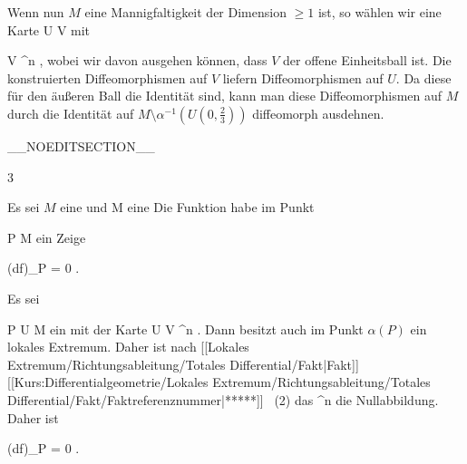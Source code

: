 {Wenn nun $M$ eine Mannigfaltigkeit der Dimension $\geq 1$ ist, so wählen wir eine Karte
\maabbdisp {\alpha} { U } {V
} {}
mit

\mavergleichskette
{\vergleichskette
{ V
}
{ \subseteq }{  \R^n
}
{  }{
}
{    }{
}
{   }{
}
}
{}{}{,}
wobei wir
 {} {}
davon ausgehen können, dass $V$
 {} {}
der offene Einheitsball ist. Die konstruierten Diffeomorphismen auf $V$ liefern Diffeomorphismen auf $U$. Da diese für den äußeren Ball
 {} {}
die Identität sind, kann man diese Diffeomorphismen auf $M$ durch die Identität auf $M \setminus \alpha^{-1} \left(  U \left(   0 , { \frac{   2 }{  3 } }   \right)  \right)$ diffeomorph ausdehnen.

 }

__NOEDITSECTION__

{3}

{

Es sei $M$ eine
und
 { M } {\R
} {}
eine
Die Funktion habe im Punkt

\mavergleichskette
{\vergleichskette
{ P
}
{ \in }{ M
}
{  }{
}
{    }{
}
{   }{
}
}
{}{}{}
ein
Zeige

\mavergleichskettedisp
{\vergleichskette
{ (df)_P
}
{ =} { 0
}
{ } {
}
{ } {
}
{ } {
}
}
{}{}{.}

}
{

Es sei

\mavergleichskette
{\vergleichskette
{ P
}
{ \in }{  U
}
{ \subseteq }{ M
}
{    }{
}
{   }{
}
}
{}{}{}
ein
mit der Karte
\maabb {\alpha} { U } {V \subseteq \R^n
} {.}
Dann besitzt auch
 im Punkt $\alpha(P)$ ein lokales Extremum.
Daher ist nach
[[Lokales Extremum/Richtungsableitung/Totales Differential/Fakt|Fakt]] [[Kurs:Differentialgeometrie/Lokales Extremum/Richtungsableitung/Totales Differential/Fakt/Faktreferenznummer|*****]]  (2)
das
 {\R^n } {\R
} {}
die Nullabbildung. Daher ist

\mavergleichskette
{\vergleichskette
{ (df)_P
}
{ = }{ 0
}
{  }{
}
{    }{
}
{   }{
}
}
{}{}{.}

 }

